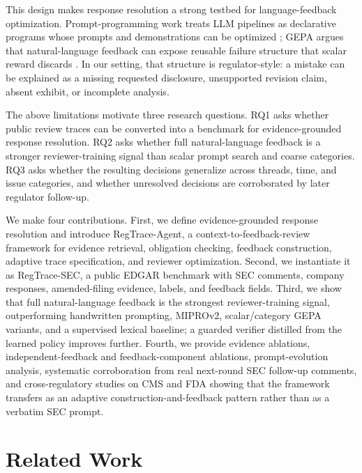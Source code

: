 \documentclass[11pt]{article}
\newcommand{\task}{evidence-grounded response resolution}
\newcommand{\dataset}{RegTrace-SEC}
\newcommand{\framework}{RegTrace-Agent}
\begin{document}
This design makes response resolution a strong testbed for language-feedback optimization. Prompt-programming work treats LLM pipelines as declarative programs whose prompts and demonstrations can be optimized \citep{khattab2023dspy}; GEPA argues that natural-language feedback can expose reusable failure structure that scalar reward discards \citep{agrawal2026gepa}. In our setting, that structure is regulator-style: a mistake can be explained as a missing requested disclosure, unsupported revision claim, absent exhibit, or incomplete analysis.

The above limitations motivate three research questions. RQ1 asks whether public review traces can be converted into a benchmark for evidence-grounded response resolution. RQ2 asks whether full natural-language feedback is a stronger reviewer-training signal than scalar prompt search and coarse categories. RQ3 asks whether the resulting decisions generalize across threads, time, and issue categories, and whether unresolved decisions are corroborated by later regulator follow-up.

We make four contributions. First, we define \task{} and introduce \framework{}, a context-to-feedback-review framework for evidence retrieval, obligation checking, feedback construction, adaptive trace specification, and reviewer optimization. Second, we instantiate it as \dataset{}, a public EDGAR benchmark with SEC comments, company responses, amended-filing evidence, labels, and feedback fields. Third, we show that full natural-language feedback is the strongest reviewer-training signal, outperforming handwritten prompting, MIPROv2, scalar/category GEPA variants, and a supervised lexical baseline; a guarded verifier distilled from the learned policy improves further. Fourth, we provide evidence ablations, independent-feedback and feedback-component ablations, prompt-evolution analysis, systematic corroboration from real next-round SEC follow-up comments, and cross-regulatory studies on CMS and FDA showing that the framework transfers as an adaptive construction-and-feedback pattern rather than as a verbatim SEC prompt.

\section{Related Work}
\end{document}
